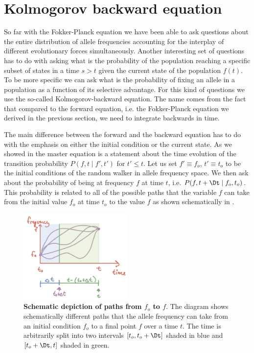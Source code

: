 \section{Kolmogorov backward equation}

So far with the Fokker-Planck equation we have been able to ask questions about
the entire distribution of allele frequencies accounting for the interplay of
different evolutionary forces simultaneously. Another interesting set of
questions has to do with asking what is the probability of the population
reaching a specific subset of states in a time $s > t$ given the current state
of the population $f(t)$. To be more specific we can ask what is the
probability of fixing an allele in a population as a function of its selective
advantage. For this kind of questions we use the so-called Kolmogorov-backward
equation. The name comes from the fact that compared to the forward equation,
i.e. the Fokker-Planck equation we derived in the previous section, we need to
integrate backwards in time.

The main difference between the forward and the backward equation has to do
with the emphasis on either the initial condition or the current state. As we
showed in  the master equation is a statement about the
time evolution of the transition probability $P(f, t \mid f', t')$ for $t' \leq
t$. Let us set $f' \equiv f_o$, $t' \equiv t_o$ to be the initial conditions of
the random walker in allele frequency space. We then ask about the probability
of being at frequency $f$ at time $t$, i.e. $P(f, t + \Dt \mid f_o, t_o)$. This
probability is related to all of the possible paths that the variable $f$ can
take from the initial value $f_o$ at time $t_o$ to the value $f$ as shown
schematically in .

\begin{figure}[h!]
	\centering \includegraphics[width=0.5\textwidth]
  {./fig/chapter_prob/05_00001.png}
	\caption{\textbf{Schematic depiction of paths from $f_o$ to $f$}. The
	diagram shows schematically different paths that the allele frequency can
	take from an initial condition $f_o$ to a final point $f$ over a time $t$.
	The time is arbitrarily split into two intervals $[t_o, t_o + \Dt]$ shaded
	in blue and $[t_o + \Dt, t]$ shaded in green.}
  \label{fig05_00001}
\end{figure}

